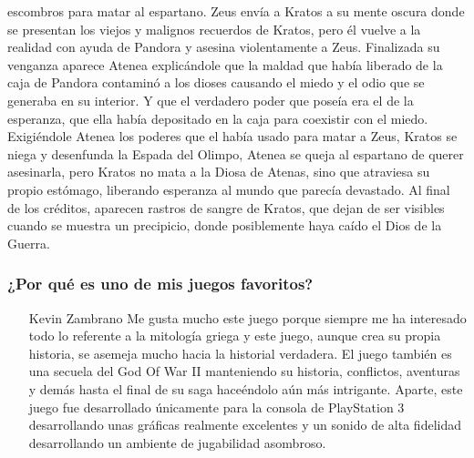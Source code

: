 escombros para matar al espartano. Zeus envía a Kratos a su mente oscura donde se presentan los viejos y malignos recuerdos de Kratos, pero él vuelve a la realidad con ayuda de Pandora y asesina violentamente a Zeus. Finalizada su venganza aparece Atenea explicándole que la maldad que había liberado de la caja de Pandora contaminó a los dioses causando el miedo y el odio que se generaba en su interior. Y que el verdadero poder que poseía era el de la esperanza, que ella había depositado en la caja para coexistir con el miedo. Exigiéndole Atenea los poderes que el había usado para matar a Zeus, Kratos se niega y desenfunda la Espada del Olimpo, Atenea se queja al espartano de querer asesinarla, pero Kratos no mata a la Diosa de Atenas, sino que atraviesa su propio estómago, liberando esperanza al mundo que parecía devastado. Al final de los créditos, aparecen rastros de sangre de Kratos, que dejan de ser visibles cuando se muestra un precipicio, donde posiblemente haya caído el Dios de la Guerra.

\subsubsection{¿Por qué es uno de mis juegos favoritos?}
\begin{itemize}
\item[Kevin Zambrano] Me gusta mucho este juego porque siempre me ha interesado todo lo referente a la mitología griega y este juego, aunque crea su propia historia, se asemeja mucho hacia la historial verdadera. El juego también es una secuela del God Of War II manteniendo su historia, conflictos, aventuras y demás hasta el final de su saga haceéndolo aún más intrigante. Aparte, este juego fue desarrollado únicamente para la consola de PlayStation 3 desarrollando unas gráficas realmente excelentes y un sonido de alta fidelidad desarrollando un ambiente de jugabilidad asombroso.
\end{itemize}

